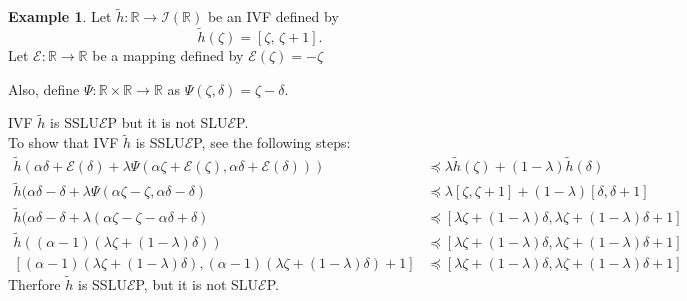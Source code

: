 \documentclass[12pt, reqno]{amsart}
\theoremstyle{definition}
\newtheorem{example}{Example}[section]
\theoremstyle{remark}
\numberwithin{equation}{section}
\begin{document}
\begin{example} \label{example3.2}
   Let $\tilde{h} : \mathbb{R} \to \mathcal{I}(\mathbb{R})$ be an IVF defined by
\[
\tilde{h}(\zeta) = [\zeta,\, \zeta + 1].
\]
Let $\mathcal{E} : \mathbb{R} \to \mathbb{R}$ be a mapping defined by $\mathcal{E}(\zeta) = -\zeta$
\

Also, define $\Psi : \mathbb{R} \times \mathbb{R} \to \mathbb{R}$ as $\Psi(\zeta, \delta) = \zeta - \delta.$


IVF \( \tilde{h} \) is SSLU\(\mathcal{\mathcal{E}}\)P  but it is not SLU\(\mathcal{\mathcal{E}}\)P.\\

To show that IVF \( \tilde{h} \) is SSLU\(\mathcal{\mathcal{E}}\)P, see the following steps: 
\begin{equation*}
    \begin{aligned}
        \tilde{h}(\alpha \mathit{\delta}  + \mathcal{\mathcal{E}}(\mathit{\delta} ) + \lambda \Psi(\alpha \mathit{\zeta}  + \mathcal{\mathcal{E}}(\mathit{\zeta} ), \alpha \mathit{\delta}  + \mathcal{\mathcal{E}}(\mathit{\delta} ))) 
    &\preceq \lambda \tilde{h}(\mathit{\zeta} ) + (1 - \lambda) \tilde{h}(\mathit{\delta} )\\
    \tilde{h}(\alpha \mathit{\delta} -\mathit{\delta}  + \lambda \Psi(\alpha \mathit{\zeta}  -\mathit{\zeta} , \alpha \mathit{\delta} -\mathit{\delta} ) 
    &\preceq \lambda [\mathit{\zeta} ,\mathit{\zeta} +1] + (1 - \lambda)[\mathit{\delta} ,\mathit{\delta} +1]\\
    \tilde{h}(\alpha \mathit{\delta} -\mathit{\delta}  + \lambda(\alpha \mathit{\zeta}  -\mathit{\zeta} -\alpha \mathit{\delta} +\mathit{\delta} ) 
    &\preceq  [\lambda\mathit{\zeta} +(1 - \lambda)\mathit{\delta} ,\lambda\mathit{\zeta} +(1 - \lambda)\mathit{\delta} +1]\\
    \tilde{h}((\alpha-1)( \lambda\mathit{\zeta} +(1 - \lambda)\mathit{\delta} ))
    &\preceq  [\lambda\mathit{\zeta} +(1 - \lambda)\mathit{\delta} ,\lambda\mathit{\zeta} +(1 - \lambda)\mathit{\delta} +1]\\
     [(\alpha-1)(\lambda\mathit{\zeta} +(1 - \lambda)\mathit{\delta} ),(\alpha-1)(\lambda\mathit{\zeta} +(1 - \lambda)\mathit{\delta} )+1]
     &\preceq  [\lambda\mathit{\zeta} +(1 - \lambda)\mathit{\delta} ,\lambda\mathit{\zeta} +(1 - \lambda)\mathit{\delta} +1]
    \end{aligned}
\end{equation*}
Therfore $\tilde{h}$ is SSLU$\mathcal{\mathcal{E}}$P, but it is not SLU$\mathcal{\mathcal{E}}$P.\\

\end{example}
\end{document}
